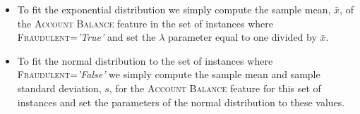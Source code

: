 \documentclass[xcolor={table}]{beamer}
\newcommand{\featN}[1]{\textsc{#1}}
\newcommand{\featL}[1]{\textit{'#1'}}
\begin{document}
\begin{frame} 
\begin{itemize}
\item To fit the exponential distribution we simply compute the sample mean, $\bar{x}$, of the \featN{Account Balance} feature in the set of instances where \featN{Fraudulent}=\featL{True} and set the $\lambda$ parameter equal to one divided by $\bar{x}$. 
\item To fit the normal distribution to the set of instances where \featN{Fraudulent}=\featL{False} we simply compute the sample mean and sample standard deviation, $s$, for the \featN{Account Balance} feature for this set of instances and set the parameters of the normal distribution to these values. 
\end{itemize}
\end{frame} 
\end{document}
